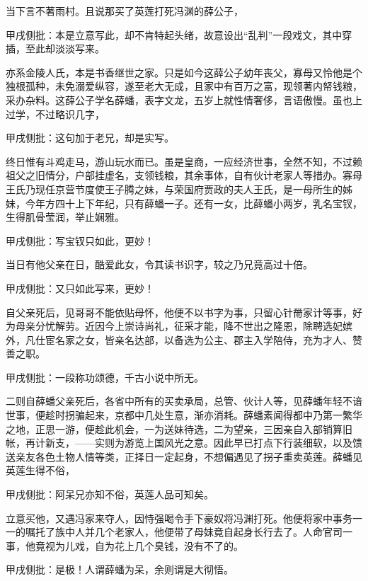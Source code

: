 \begin{parag}
    当下言不著雨村。且说那买了英莲打死冯渊的薛公子，\begin{note}甲戌侧批：本是立意写此，却不肯特起头绪，故意设出“乱判”一段戏文，其中穿插，至此却淡淡写来。\end{note}亦系金陵人氏，本是书香继世之家。只是如今这薛公子幼年丧父，寡母又怜他是个独根孤种，未免溺爱纵容，遂至老大无成，且家中有百万之富，现领著内帑钱粮，采办杂料。这薛公子学名薛蟠，表字文龙，五岁上就性情奢侈，言语傲慢。虽也上过学，不过略识几字，\begin{note}甲戌侧批：这句加于老兄，却是实写。\end{note}终日惟有斗鸡走马，游山玩水而已。虽是皇商，一应经济世事，全然不知，不过赖祖父之旧情分，户部挂虚名，支领钱粮，其余事体，自有伙计老家人等措办。寡母王氏乃现任京营节度使王子腾之妹，与荣国府贾政的夫人王氏，是一母所生的姊妹，今年方四十上下年纪，只有薛蟠一子。还有一女，比薛蟠小两岁，乳名宝钗，生得肌骨莹润，举止娴雅。\begin{note}甲戌侧批：写宝钗只如此，更妙！\end{note}当日有他父亲在日，酷爱此女，令其读书识字，较之乃兄竟高过十倍。\begin{note}甲戌侧批：又只如此写来，更妙！\end{note}自父亲死后，见哥哥不能依贴母怀，他便不以书字为事，只留心针黹家计等事，好为母亲分忧解劳。近因今上崇诗尚礼，征采才能，降不世出之隆恩，除聘选妃嫔外，凡仕宦名家之女，皆亲名达部，以备选为公主、郡主入学陪侍，充为才人、赞善之职。\begin{note}甲戌侧批：一段称功颂德，千古小说中所无。\end{note}二则自薛蟠父亲死后，各省中所有的买卖承局，总管、伙计人等，见薛蟠年轻不谙世事，便趁时拐骗起来，京都中几处生意，渐亦消耗。薛蟠素闻得都中乃第一繁华之地，正思一游，便趁此机会，一为送妹待选，二为望亲，三因亲自入部销算旧帐，再计新支，——实则为游览上国风光之意。因此早已打点下行装细软，以及馈送亲友各色土物人情等类，正择日一定起身，不想偏遇见了拐子重卖英莲。薛蟠见英莲生得不俗，\begin{note}甲戌侧批：阿呆兄亦知不俗，英莲人品可知矣。\end{note}立意买他，又遇冯家来夺人，因恃强喝令手下豪奴将冯渊打死。他便将家中事务一一的嘱托了族中人并几个老家人，他便带了母妹竟自起身长行去了。人命官司一事，他竟视为儿戏，自为花上几个臭钱，没有不了的。\begin{note}甲戌侧批：是极！人谓薛蟠为呆，余则谓是大彻悟。\end{note}
\end{parag}


